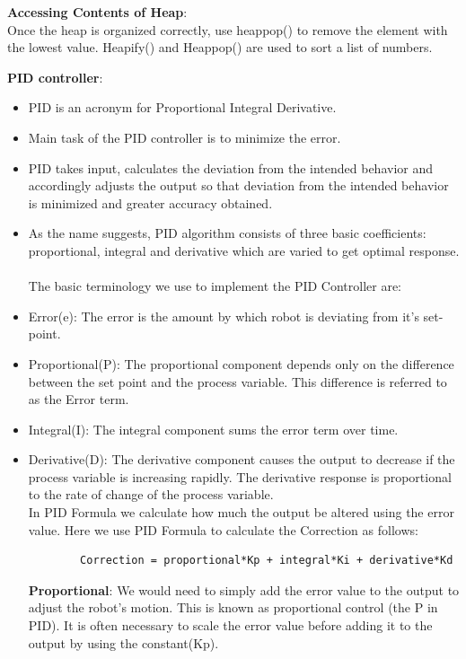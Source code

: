 \documentclass[report]{res}
\begin{document}
	\textbf{Accessing Contents of Heap}:\\	
	Once the heap is organized correctly, use heappop() to remove the element with the lowest value. Heapify() and Heappop() are used to sort a list of numbers.
	
	\textbf{PID controller}:
	
	\begin{itemize}
		
		\item	PID is an acronym for Proportional Integral Derivative.
		\item	Main task of the PID controller is to minimize the error.
		\item	PID takes input, calculates the deviation from the intended behavior and accordingly adjusts the output so that deviation from the intended behavior is minimized and greater accuracy obtained.
		\item	As the name suggests, PID algorithm consists of three basic coefficients: proportional, integral and derivative which are varied to get optimal response. 
		\\ \\The basic terminology we use to implement the PID Controller are:
		\item	Error(e): The error is the amount by which robot is deviating from it’s set-point.
		\item	Proportional(P): The proportional component depends only on the difference between the set point and the process variable. This difference is referred to as the Error term.
		\item	Integral(I): The integral component sums the error term over time.
		\item	Derivative(D): The derivative component causes the output to decrease if the process variable is increasing rapidly. The derivative response is proportional to the rate of change of the process variable.
		\\
		In PID Formula we calculate how much the output be altered using the error value. Here we use PID Formula to calculate the Correction as follows:
		
		\begin{lstlisting}
		Correction = proportional*Kp + integral*Ki + derivative*Kd
		\end{lstlisting}
		
		\textbf{Proportional}: We would need to simply add the error value to the output to adjust the robot’s motion. This is known as proportional control (the P in PID). It is often necessary to scale the error value before adding it to the output by using the constant(Kp).
		

\end{itemize}
\end{document}
